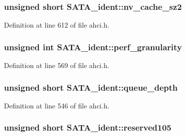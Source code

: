 \subsubsection[{\texorpdfstring{nv\+\_\+cache\+\_\+sz2}{nv_cache_sz2}}]{\setlength{\rightskip}{0pt plus 5cm}unsigned short S\+A\+T\+A\+\_\+ident\+::nv\+\_\+cache\+\_\+sz2}\hypertarget{structSATA__ident_a3d5a99c03cd6d648e743734cb5982f8d}{}\label{structSATA__ident_a3d5a99c03cd6d648e743734cb5982f8d}


Definition at line 612 of file ahci.\+h.

\subsubsection[{\texorpdfstring{perf\+\_\+granularity}{perf_granularity}}]{\setlength{\rightskip}{0pt plus 5cm}unsigned int S\+A\+T\+A\+\_\+ident\+::perf\+\_\+granularity}\hypertarget{structSATA__ident_a6497132c3ec773dfe63a6d9e671bcd6b}{}\label{structSATA__ident_a6497132c3ec773dfe63a6d9e671bcd6b}


Definition at line 569 of file ahci.\+h.

\subsubsection[{\texorpdfstring{queue\+\_\+depth}{queue_depth}}]{\setlength{\rightskip}{0pt plus 5cm}unsigned short S\+A\+T\+A\+\_\+ident\+::queue\+\_\+depth}\hypertarget{structSATA__ident_adcc438f4fea20d3923975c215a3b4bdb}{}\label{structSATA__ident_adcc438f4fea20d3923975c215a3b4bdb}


Definition at line 546 of file ahci.\+h.

\subsubsection[{\texorpdfstring{reserved105}{reserved105}}]{\setlength{\rightskip}{0pt plus 5cm}unsigned short S\+A\+T\+A\+\_\+ident\+::reserved105}\hypertarget{structSATA__ident_abf5b445f2faecb276859b5c8c7b7a5e6}{}\label{structSATA__ident_abf5b445f2faecb276859b5c8c7b7a5e6}


